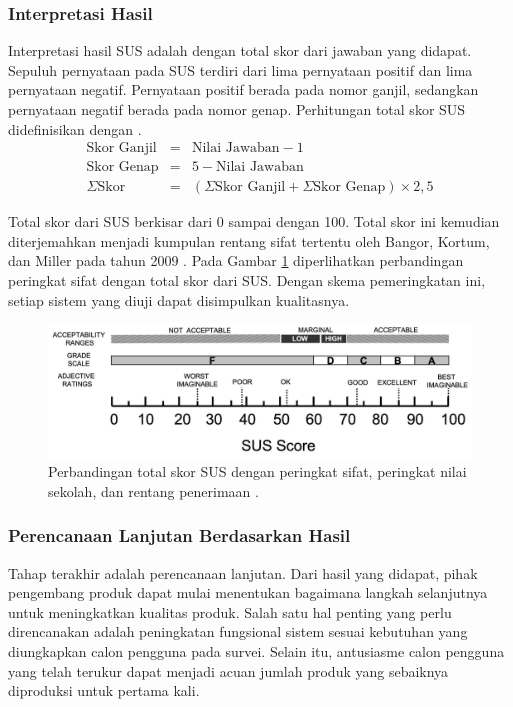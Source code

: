 \subsubsection{Interpretasi Hasil}
Interpretasi hasil SUS adalah dengan total skor dari jawaban yang didapat. Sepuluh pernyataan pada SUS terdiri dari lima pernyataan positif dan lima pernyataan negatif. Pernyataan positif berada pada nomor ganjil, sedangkan pernyataan negatif berada pada nomor genap. Perhitungan total skor SUS didefinisikan dengan \cite{SUS}.
\begin{eqnarray}
    \text{Skor Ganjil}&=&\text{Nilai Jawaban}-1\\
    \text{Skor Genap}&=&5-\text{Nilai Jawaban}\\
    \Sigma\text{Skor}&=&\left(\Sigma\text{Skor Ganjil}+\Sigma\text{Skor Genap}\right)\times 2,5
\end{eqnarray}

Total skor dari SUS berkisar dari 0 sampai dengan 100. Total skor ini kemudian diterjemahkan menjadi kumpulan rentang sifat tertentu oleh Bangor, Kortum, dan Miller pada tahun 2009 \cite{SUSAdjective}. Pada Gambar \ref{fig:SUSAdjective} diperlihatkan perbandingan peringkat sifat dengan total skor dari SUS. Dengan skema pemeringkatan ini, setiap sistem yang diuji dapat disimpulkan kualitasnya. \par
\begin{figure}[t!]
    \centering
    \includegraphics[width=14cm]{Gambar/adjective-sus.jpg}
    \caption{Perbandingan total skor SUS dengan peringkat sifat, peringkat nilai sekolah, dan rentang penerimaan \cite{SUSAdjective}.}
    \label{fig:SUSAdjective}
\end{figure} 

\subsubsection{Perencanaan Lanjutan Berdasarkan Hasil}
Tahap terakhir adalah perencanaan lanjutan. Dari hasil yang didapat, pihak pengembang produk dapat mulai menentukan bagaimana langkah selanjutnya untuk meningkatkan kualitas produk. Salah satu hal penting yang perlu direncanakan adalah peningkatan fungsional sistem sesuai kebutuhan yang diungkapkan calon pengguna pada survei. Selain itu, antusiasme calon pengguna yang telah terukur dapat menjadi acuan jumlah produk yang sebaiknya diproduksi untuk pertama kali. \par
